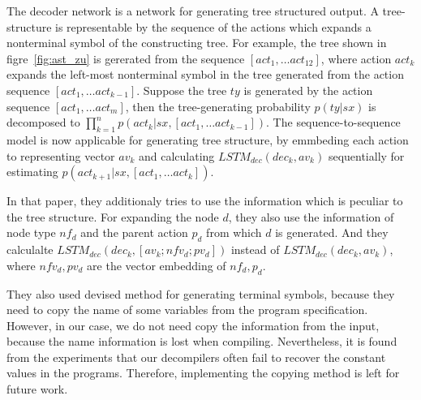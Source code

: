 \documentclass[senior,final,11pt]{iscs-thesis}
\begin{document}
The decoder network is a network for generating tree structured output. 
A tree-structure is representable by the sequence of the actions which expands a nonterminal symbol of the constructing tree.
For example, the tree shown in figre~\ref{fig:ast_zu} is gererated from the sequence $ [act_1, \dots act_{12}] $, 
where action $ act_k $ expands the left-most nonterminal symbol in the tree generated from the action sequence $ [act_1, \dots act_{k-1}] $. 
Suppose the tree $ty$ is generated by the action sequence $ [act_1, \dots act_m] $, 
then the tree-generating probability $ p(ty|sx) $ is decomposed to $ \prod_{k=1}^n p(act_k|sx,[act_1, \dots act_{k-1}]) $. 
The sequence-to-sequence model is now applicable for generating tree structure, by emmbeding each action to representing vector $av_k$ and 
calculating $ LSTM_{dec}(dec_{k},av_{k}) $ sequentially for estimating $p(act_{k+1}|sx,[act_1, \dots act_{k}]) $.  


In that paper, they additionaly tries to use the information which is peculiar to the tree structure. 
For expanding the node $d$, they also use the information of node type $ nf_{d} $ and the parent action $p_{d}$ from which $d$ is generated.
And they calculalte $ LSTM_{dec}(dec_{k},[av_{k}; nfv_{d}; pv_{d}]) $ instead of $ LSTM_{dec}(dec_{k},av_{k}) $, 
where $nfv_{d},pv_{d}$ are the vector embedding of $nf_{d},p_{d}$.

They also used devised method for generating terminal symbols, because they need to copy the name of some variables from the program specification.
However, in our case, we do not need copy the information from the input, because the name information is lost when compiling.
Nevertheless, it is found from the experiments that our decompilers often fail to recover the constant values in the programs.
Therefore, implementing the copying method is left for future work.


\end{document}
